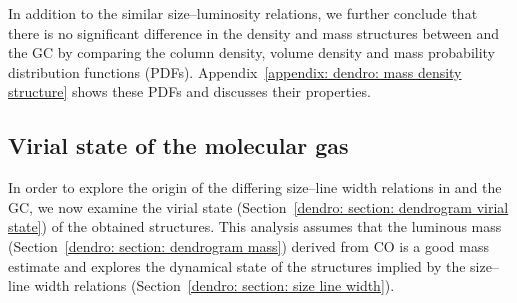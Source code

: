 In addition to the similar size--luminosity relations, we further conclude that there is no significant difference in the density and mass structures between  and the GC by comparing the column density, volume density and mass probability distribution functions (PDFs). Appendix~\ref{appendix: dendro: mass density structure} shows these PDFs and discusses their properties.



\subsection{Virial state of the molecular gas}
\label{dendro: section: virial state}

In order to explore the origin of the differing size--line width relations in  and the GC, we now examine the virial state (Section~\ref{dendro: section: dendrogram virial state}) of the obtained structures. This analysis assumes that the luminous mass (Section~\ref{dendro: section: dendrogram mass}) derived from CO is a good mass estimate and explores the dynamical state of the structures implied by the size--line width relations (Section~\ref{dendro: section: size line width}).

